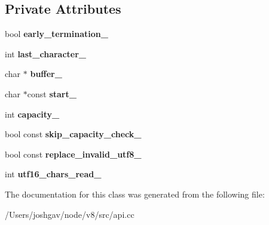 \subsection*{Private Attributes}
\begin{DoxyCompactItemize}
\item 
bool {\bfseries early\+\_\+termination\+\_\+}\hypertarget{classv8_1_1_utf8_writer_visitor_acbff3983291b62a3979f9eb9d91714b9}{}\label{classv8_1_1_utf8_writer_visitor_acbff3983291b62a3979f9eb9d91714b9}

\item 
int {\bfseries last\+\_\+character\+\_\+}\hypertarget{classv8_1_1_utf8_writer_visitor_a3646ba84e995759498ec28131eca25c1}{}\label{classv8_1_1_utf8_writer_visitor_a3646ba84e995759498ec28131eca25c1}

\item 
char $\ast$ {\bfseries buffer\+\_\+}\hypertarget{classv8_1_1_utf8_writer_visitor_a1d1b6962c15151c77edbefd049da0946}{}\label{classv8_1_1_utf8_writer_visitor_a1d1b6962c15151c77edbefd049da0946}

\item 
char $\ast$const {\bfseries start\+\_\+}\hypertarget{classv8_1_1_utf8_writer_visitor_aceca49589446acb6950ff9970a2f5e21}{}\label{classv8_1_1_utf8_writer_visitor_aceca49589446acb6950ff9970a2f5e21}

\item 
int {\bfseries capacity\+\_\+}\hypertarget{classv8_1_1_utf8_writer_visitor_a24a1c28ce9cfc8d0e77d0b929fa179a9}{}\label{classv8_1_1_utf8_writer_visitor_a24a1c28ce9cfc8d0e77d0b929fa179a9}

\item 
bool const {\bfseries skip\+\_\+capacity\+\_\+check\+\_\+}\hypertarget{classv8_1_1_utf8_writer_visitor_a784f43da1992f4f3ff674d112cf7e6e9}{}\label{classv8_1_1_utf8_writer_visitor_a784f43da1992f4f3ff674d112cf7e6e9}

\item 
bool const {\bfseries replace\+\_\+invalid\+\_\+utf8\+\_\+}\hypertarget{classv8_1_1_utf8_writer_visitor_a9e1d02edf8819136b2fbc189121f4c26}{}\label{classv8_1_1_utf8_writer_visitor_a9e1d02edf8819136b2fbc189121f4c26}

\item 
int {\bfseries utf16\+\_\+chars\+\_\+read\+\_\+}\hypertarget{classv8_1_1_utf8_writer_visitor_a141ee5e0020e961ae78404755935e11e}{}\label{classv8_1_1_utf8_writer_visitor_a141ee5e0020e961ae78404755935e11e}

\end{DoxyCompactItemize}


The documentation for this class was generated from the following file\+:\begin{DoxyCompactItemize}
\item 
/\+Users/joshgav/node/v8/src/api.\+cc\end{DoxyCompactItemize}
